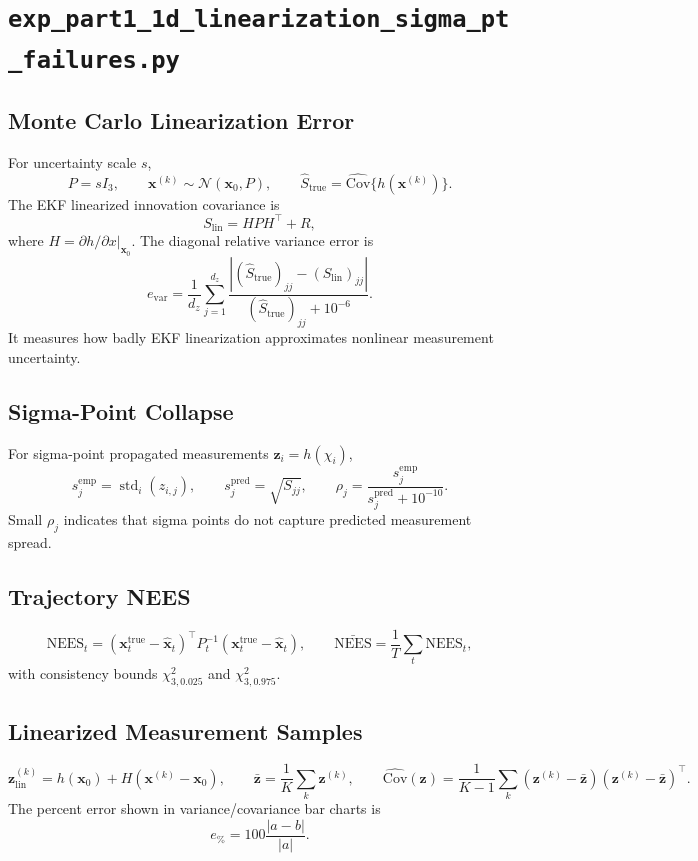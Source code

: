 \documentclass[11pt]{article}
\newcommand{\code}[1]{\texttt{#1}}
\newcommand{\Cov}{\mathrm{Cov}}
\newcommand{\NEES}{\mathrm{NEES}}
\begin{document}
\section{\code{exp\_part1\_1d\_linearization\_sigma\_pt\_failures.py}}
\subsection*{Monte Carlo Linearization Error}
For uncertainty scale \(s\),
\[
P=sI_3,\qquad
\bm{x}^{(k)}\sim\mathcal N(\bm{x}_0,P),\qquad
\hat S_{\mathrm{true}}=\widehat{\Cov}\{h(\bm{x}^{(k)})\}.
\]
The EKF linearized innovation covariance is
\[
S_{\mathrm{lin}}=HPH^\top+R,
\]
where \(H=\left.\partial h/\partial x\right|_{\bm{x}_0}\). The diagonal relative variance error is
\[
e_{\mathrm{var}}=
\frac{1}{d_z}\sum_{j=1}^{d_z}
\frac{|(\hat S_{\mathrm{true}})_{jj}-(S_{\mathrm{lin}})_{jj}|}{(\hat S_{\mathrm{true}})_{jj}+10^{-6}}.
\]
It measures how badly EKF linearization approximates nonlinear measurement uncertainty.

\subsection*{Sigma-Point Collapse}
For sigma-point propagated measurements \(\bm{z}_i=h(\chi_i)\),
\[
s^{\mathrm{emp}}_j=\operatorname{std}_i(z_{i,j}),\qquad
s^{\mathrm{pred}}_j=\sqrt{S_{jj}},\qquad
\rho_j=\frac{s^{\mathrm{emp}}_j}{s^{\mathrm{pred}}_j+10^{-10}}.
\]
Small \(\rho_j\) indicates that sigma points do not capture predicted measurement spread.

\subsection*{Trajectory NEES}
\[
\NEES_t=(\bm{x}^{\mathrm{true}}_t-\hat{\bm{x}}_t)^\top P_t^{-1}(\bm{x}^{\mathrm{true}}_t-\hat{\bm{x}}_t),
\qquad
\bar{\NEES}=\frac{1}{T}\sum_t\NEES_t,
\]
with consistency bounds \(\chi^2_{3,0.025}\) and \(\chi^2_{3,0.975}\).

\subsection*{Linearized Measurement Samples}
\[
\bm{z}^{(k)}_{\mathrm{lin}}=h(\bm{x}_0)+H(\bm{x}^{(k)}-\bm{x}_0),\qquad
\bar{\bm z}=\frac{1}{K}\sum_k\bm z^{(k)},\qquad
\widehat{\Cov}(\bm z)=\frac{1}{K-1}\sum_k(\bm z^{(k)}-\bar{\bm z})(\bm z^{(k)}-\bar{\bm z})^\top.
\]
The percent error shown in variance/covariance bar charts is
\[
e_{\%}=100\frac{|a-b|}{|a|}.
\]
\end{document}

